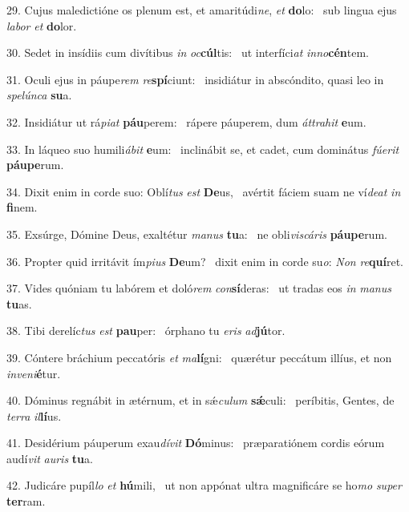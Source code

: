 29. Cujus maledictióne os plenum est, et amaritúdi\textit{ne}, \textit{et} \textbf{do}lo: \ast\  sub lingua ejus \textit{la}\textit{bor} \textit{et} \textbf{do}lor.\

30. Sedet in insídiis cum divítibus \textit{in} \textit{oc}\textbf{cúl}tis: \ast\  ut interfíci\textit{at} \textit{in}\textit{no}\textbf{cén}tem.\

31. Oculi ejus in páupe\textit{rem} \textit{re}\textbf{spí}ciunt: \ast\  insidiátur in abscóndito, quasi leo in \textit{spe}\textit{lún}\textit{ca} \textbf{su}a.\

32. Insidiátur ut rá\textit{pi}\textit{at} \textbf{páu}perem: \ast\  rápere páuperem, dum \textit{át}\textit{tra}\textit{hit} \textbf{e}um.\

33. In láqueo suo humili\textit{á}\textit{bit} \textbf{e}um: \ast\  inclinábit se, et cadet, cum dominátus \textit{fú}\textit{e}\textit{rit} \textbf{páu}\textbf{pe}rum.\

34. Dixit enim in corde suo: Oblí\textit{tus} \textit{est} \textbf{De}us, \ast\  avértit fáciem suam ne ví\textit{de}\textit{at} \textit{in} \textbf{fi}nem.\

35. Exsúrge, Dómine Deus, exaltétur \textit{ma}\textit{nus} \textbf{tu}a: \ast\  ne obli\textit{vis}\textit{cá}\textit{ris} \textbf{páu}\textbf{pe}rum.\

36. Propter quid irritávit ím\textit{pi}\textit{us} \textbf{De}um? \ast\  dixit enim in corde su\textit{o}: \textit{Non} \textit{re}\textbf{quí}ret.\

37. Vides quóniam tu labórem et doló\textit{rem} \textit{con}\textbf{sí}deras: \ast\  ut tradas eos \textit{in} \textit{ma}\textit{nus} \textbf{tu}as.\

38. Tibi derelíc\textit{tus} \textit{est} \textbf{pau}per: \ast\  órphano tu \textit{e}\textit{ris} \textit{ad}\textbf{jú}tor.\

39. Cóntere bráchium peccatóris \textit{et} \textit{ma}\textbf{lí}gni: \ast\  quærétur peccátum illíus, et non \textit{in}\textit{ve}\textit{ni}\textbf{é}tur.\

40. Dóminus regnábit in ætérnum, et in sǽ\textit{cu}\textit{lum} \textbf{sǽ}culi: \ast\  períbitis, Gentes, de \textit{ter}\textit{ra} \textit{il}\textbf{lí}us.\

41. Desidérium páuperum exau\textit{dí}\textit{vit} \textbf{Dó}minus: \ast\  præparatiónem cordis eórum audí\textit{vit} \textit{au}\textit{ris} \textbf{tu}a.\

42. Judicáre pupíl\textit{lo} \textit{et} \textbf{hú}mili, \ast\  ut non appónat ultra magnificáre se ho\textit{mo} \textit{su}\textit{per} \textbf{ter}ram.\

